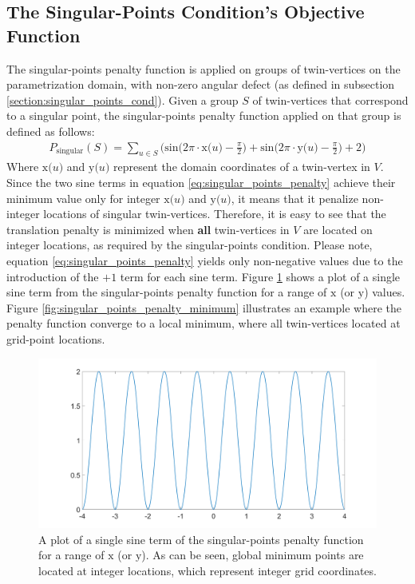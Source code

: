 \subsection{The Singular-Points Condition's Objective Function}
The singular-points penalty function is applied on groups of twin-vertices on the parametrization domain, with non-zero angular defect (as defined in subsection \ref{section:singular_points_cond}). Given a group $S$ of twin-vertices that correspond to a singular point, the singular-points penalty function applied on that group is defined as follows:
\begin{equation}\label{eq:singular_points_penalty}
\begin{split}
P_{\mathrm{singular}}\left(S\right) = \sum_{u \in S} \bigg( \mathrm{sin} \Big( 2\pi\cdot\mathrm{x}\big(u\big) - \frac{\pi}{2}\Big) + \mathrm{sin} \Big( 2\pi\cdot\mathrm{y}\big(u\big) - \frac{\pi}{2}\Big) + 2 \bigg)
\end{split}
\end{equation}
Where $\mathrm{x}\big(u\big)$ and $\mathrm{y}\big(u\big)$ represent the domain coordinates of a twin-vertex in $V$. Since the two sine terms in equation \ref{eq:singular_points_penalty} achieve their minimum value only for integer $\mathrm{x}\big(u\big)$ and $\mathrm{y}\big(u\big)$, it means that it penalize non-integer locations of singular twin-vertices. Therefore, it is easy to see that the translation penalty is minimized when \textbf{all} twin-vertices in $V$ are located on integer locations, as required by the singular-points condition. Please note, equation \ref{eq:singular_points_penalty} yields only non-negative values due to the introduction of the $+1$ term for each sine term. Figure \ref{fig:singular_points_penalty_sine_term} shows a plot of a single sine term from the singular-points penalty function for a range of $\mathrm{x}$ (or $\mathrm{y}$) values. Figure \ref{fig:singular_points_penalty_minimum} illustrates an example where the penalty function converge to a local minimum, where all twin-vertices located at grid-point locations.
\begin{figure}[ht]
\centering
\includegraphics[width=13cm]{figures/singular_points/singular_points_penalty_function_sine_term.png}
\caption[The Singular-Points Penalty Function (Single Sine Term)]{A plot of a single sine term of the singular-points penalty function for a range of $\mathrm{x}$ (or $\mathrm{y}$). As can be seen, global minimum points are located at integer locations, which represent integer grid coordinates.}
\label{fig:singular_points_penalty_sine_term}
\end{figure}
